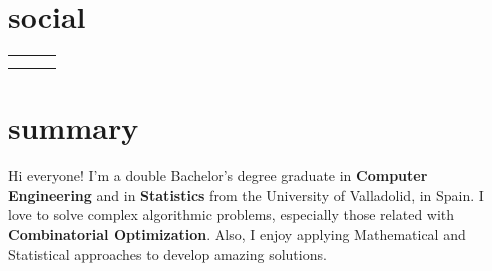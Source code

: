 \documentclass{friggeri-cv}
\newcommand{\myhref}[2]{\href[pdfnewwindow=true]{#1}{#2}}
\begin{document}


  \section{social}

    \vspace{-1.5em}
    \begin{center}
      \renewcommand{\arraystretch}{1.5}
      \begin{tabular}{ p{18em} p{19em} p{18em} }
        \myhref{https://garciparedes.me}{\faHome\quad Website: garciparedes.me}
        &
        \myhref{mailto:sergio@garciparedes.me}{\faEnvelope\quad Email: sergio@garciparedes.me}
        &
        \myhref{https://es.linkedin.com/in/garciparedes/en}{\faLinkedin\quad LinkedIn: Sergio García Prado}
        \\

        \myhref{https://github.com/garciparedes}{\faGithub\quad GitHub: @garciparedes}
        &
        \myhref{https://scholar.google.es/citations?user=X3Mb7BAAAAAJ}{\faGraduationCap\quad Scholar: Sergio García Prado}
        &
        \myhref{https://stackoverflow.com/users/3921457/garciparedes}{\faStackOverflow\quad StackOverflow: @garciparedes}
        \\
      \end{tabular}
    \end{center}




  \section{summary}

  Hi everyone! I'm a double Bachelor's degree graduate in \textbf{Computer Engineering} and in \textbf{Statistics} from the University of Valladolid, in Spain. I love to solve complex algorithmic problems, especially those related with \textbf{Combinatorial Optimization}. Also, I enjoy applying Mathematical and Statistical approaches to develop amazing solutions. 
\end{document}
